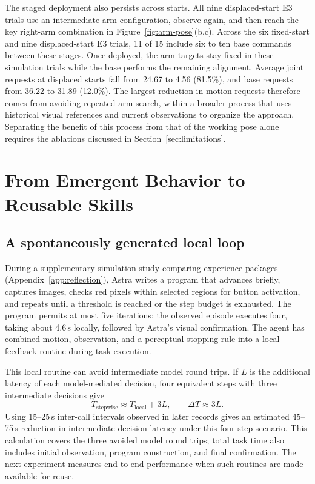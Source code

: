 \documentclass[11pt]{article}
\begin{document}
The staged deployment also persists across starts. All nine displaced-start E3 trials use an intermediate arm configuration, observe again, and then reach the key right-arm combination in Figure~\ref{fig:arm-pose}(b,c). Across the six fixed-start and nine displaced-start E3 trials, 11 of 15 include six to ten base commands between these stages. Once deployed, the arm targets stay fixed in these simulation trials while the base performs the remaining alignment. Average joint requests at displaced starts fall from 24.67 to 4.56 (81.5\%), and base requests from 36.22 to 31.89 (12.0\%). The largest reduction in motion requests therefore comes from avoiding repeated arm search, within a broader process that uses historical visual references and current observations to organize the approach. Separating the benefit of this process from that of the working pose alone requires the ablations discussed in Section~\ref{sec:limitations}.

\section{From Emergent Behavior to Reusable Skills}
\subsection{A spontaneously generated local loop}
During a supplementary simulation study comparing experience packages (Appendix~\ref{app:reflection}), Astra writes a program that advances briefly, captures images, checks red pixels within selected regions for button activation, and repeats until a threshold is reached or the step budget is exhausted. The program permits at most five iterations; the observed episode executes four, taking about 4.6\,s locally, followed by Astra's visual confirmation. The agent has combined motion, observation, and a perceptual stopping rule into a local feedback routine during task execution.

This local routine can avoid intermediate model round trips. If $L$ is the additional latency of each model-mediated decision, four equivalent steps with three intermediate decisions give
\begin{equation}
T_{\mathrm{stepwise}}\approx T_{\mathrm{local}}+3L,
\qquad \Delta T\approx3L.
\end{equation}
Using 15--25\,s inter-call intervals observed in later records gives an estimated 45--75\,s reduction in intermediate decision latency under this four-step scenario. This calculation covers the three avoided model round trips; total task time also includes initial observation, program construction, and final confirmation. The next experiment measures end-to-end performance when such routines are made available for reuse.
\end{document}
